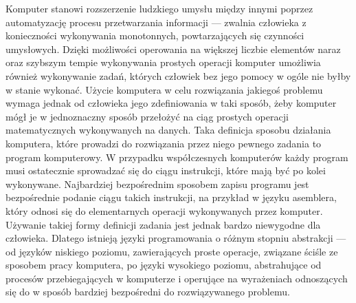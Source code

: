 Komputer stanowi rozszerzenie ludzkiego umysłu między innymi poprzez automatyzację procesu przetwarzania informacji --- zwalnia człowieka z konieczności wykonywania monotonnych, powtarzających się czynności umysłowych. Dzięki możliwości operowania na większej liczbie elementów naraz oraz szybszym tempie wykonywania prostych operacji komputer umożliwia również wykonywanie zadań, których człowiek bez jego pomocy w ogóle nie byłby w stanie wykonać. Użycie komputera w celu rozwiązania jakiegoś problemu wymaga jednak od człowieka jego zdefiniowania w taki sposób, żeby komputer mógł je w jednoznaczny sposób przełożyć na ciąg prostych operacji matematycznych wykonywanych na danych. Taka definicja sposobu działania komputera, które prowadzi do rozwiązania przez niego pewnego zadania to program komputerowy. W przypadku współczesnych komputerów każdy program musi ostatecznie sprowadzać się do ciągu instrukcji, które mają być po kolei wykonywane. Najbardziej bezpośrednim sposobem zapisu programu jest bezpośrednie podanie ciągu takich instrukcji, na przykład w języku asemblera, który odnosi się do elementarnych operacji wykonywanych przez komputer. Używanie takiej formy definicji zadania jest jednak bardzo niewygodne dla człowieka. Dlatego istnieją języki programowania o różnym stopniu abstrakcji --- od języków niskiego poziomu, zawierających proste operacje, związane ściśle ze sposobem pracy komputera, po języki wysokiego poziomu, abstrahujące od procesów przebiegających w komputerze i operujące na wyrażeniach odnoszących się do w sposób bardziej bezpośredni do rozwiązywanego problemu.


